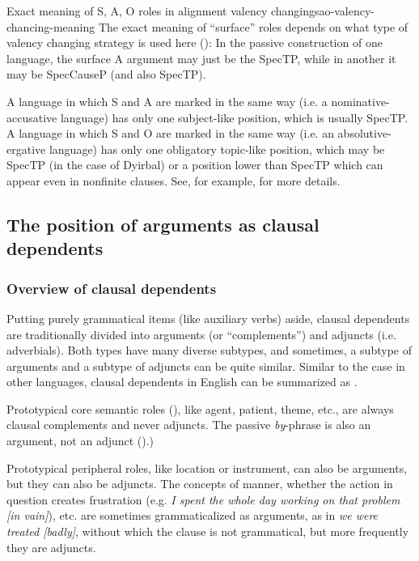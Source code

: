 \documentclass[UTF8, a4paper, oneside, scheme=plain]{ctexrep}
\newcommand{\corpus}[1]{\emph{#1}}
\begin{document}
\begin{theorybox}{Exact meaning of S, A, O roles in alignment valency changing}{sao-valency-chancing-meaning}
    The exact meaning of ``surface'' roles depends on 
    what type of valency changing strategy is used here ():
    In the passive construction of one language, the surface A argument may just be the SpecTP,
    while in another it may be SpecCauseP (and also SpecTP).

    A language in which S and A are marked in the same way (i.e. a nominative-accusative language)
    has only one subject-like position, which is usually SpecTP.
    A language in which S and O are marked in the same way (i.e. an absolutive-ergative language)
    has only one obligatory topic-like position,
    which may be SpecTP (in the case of Dyirbal) 
    or a position lower than SpecTP which can appear even in nonfinite clauses.
    See, for example, \citet{aldridge2008generative} for more details.
\end{theorybox}

\subsection{The position of arguments as clausal dependents}\label{sec:valency.overview.dependents}

\subsubsection{Overview of clausal dependents}\label{sec:valency.overview.dependents.classes}

Putting purely grammatical items (like auxiliary verbs) aside,
clausal dependents are traditionally divided into arguments (or ``complements'') and adjuncts (i.e. adverbials).
Both types have many diverse subtypes,
and sometimes, 
a subtype of arguments and a subtype of adjuncts can be quite similar.
Similar to the case in other languages, 
clausal dependents in English can be summarized as .

Prototypical core semantic roles (), 
like agent, patient, theme, etc.,
are always clausal complements and never adjuncts.
The passive \corpus{by}-phrase is also an argument, not an adjunct 
().)

Prototypical peripheral roles, like location or instrument, can also be arguments,
but they can also be adjuncts.
The concepts of manner, whether the action in question creates frustration 
(e.g. \corpus{I spent the whole day working on that problem [in vain]}), etc.
are sometimes grammaticalized as arguments,
as in \corpus{we were treated [badly]},
without which the clause is not grammatical,
but more frequently they are adjuncts.
\end{document}
